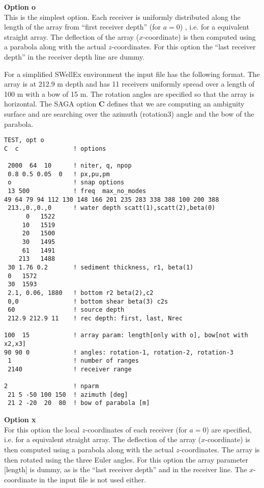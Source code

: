 \documentclass{saclantc}
\begin{document}
{\large \bf Option o}\\
This is the simplest option. 
Each receiver is uniformly distributed along the length of the array from
``first receiver depth'' (for $a=0$) , i.e. for a equivalent straight array. The deflection of the
array ($x$-coordinate) is then computed using a parabola along with
the actual $z$-coordinates. 
For this option the ``last receiver depth'' 
in the receiver depth line are dummy.

For a simplified SWellEx environment the input file has the following
format. The array is at 212.9 m depth and has 11 receivers uniformly
spread over a length of 100 m with a
bow of 15 m. The rotation angles are specified so that the array is
horizontal. The SAGA option {\bf C} defines that we are computing an
ambiguity surface and are searching over the azimuth (rotation3) angle and the bow
of the parabola.
\small
\begin{verbatim}
TEST, opt o
C  c               ! options 

 2000  64  10      ! niter, q, npop
 0.8 0.5 0.05  0   ! px,pu,pm
 o                 ! snap options
 13 500            ! freq  max_no_modes
49 64 79 94 112 130 148 166 201 235 283 338 388 100 200 388
 213.,0.,0.,0      ! water depth scatt(1),scatt(2),beta(0)
      0   1522 
     10   1519 
     20   1500 
     30   1495 
     61   1491 
    213   1488 
 30 1.76 0.2       ! sediment thickness, r1, beta(1)
 0   1572
 30  1593
 2.1, 0.06, 1880   ! bottom r2 beta(2),c2
 0,0               ! bottom shear beta(3) c2s
 60                ! source depth
 212.9 212.9 11    ! rec depth: first, last, Nrec

100  15            ! array param: length[only with o], bow[not with x2,x3]
90 90 0            ! angles: rotation-1, rotation-2, rotation-3
 1                 ! number of ranges
 2140              ! receiver range

2                  ! nparm                 
 21 5 -50 100 150  ! azimuth [deg]
 21 2 -20  20  80  ! bow of parabola [m]
\end{verbatim}
\normalsize

{\large \bf Option x}\\
For this option the local $z$-coordinates of each receiver (for $a=0$) are
specified, i.e. for a equivalent straight array. The deflection of the
array ($x$-coordinate) is then computed using a parabola along with
the actual $z$-coordinates. The array is then rotated using the three Euler angles.
For this option the array parameter [length] is
dummy, as is the ``last receiver depth'' and in
the receiver line. The $x$-coordinate in the input file is not used either.
\end{document}
